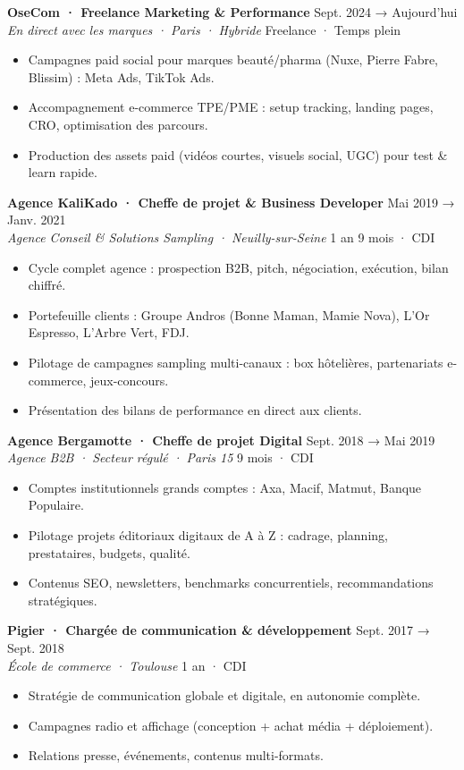 \documentclass[a4paper,10pt]{article}
\newcommand{\expheader}[4]{%
  \textbf{\color{brown}#1} \hfill \color{greydark}\footnotesize #2 \\[-1pt]
  \textit{\color{greydark}\small #3} \hfill \color{greymid}\footnotesize #4 \\[2pt]
}
\begin{document}
\expheader{OseCom · Freelance Marketing \& Performance}{Sept. 2024 → Aujourd'hui}{En direct avec les marques · Paris · Hybride}{Freelance · Temps plein}
\begin{itemize}[leftmargin=12pt,itemsep=1pt,topsep=2pt]
  \item Campagnes paid social pour marques beauté/pharma (Nuxe, Pierre Fabre, Blissim) : Meta Ads, TikTok Ads.
  \item Accompagnement e-commerce TPE/PME : setup tracking, landing pages, CRO, optimisation des parcours.
  \item Production des assets paid (vidéos courtes, visuels social, UGC) pour test \& learn rapide.
\end{itemize}

\expheader{Agence KaliKado · Cheffe de projet \& Business Developer}{Mai 2019 → Janv. 2021}{Agence Conseil \& Solutions Sampling · Neuilly-sur-Seine}{1 an 9 mois · CDI}
\begin{itemize}[leftmargin=12pt,itemsep=1pt,topsep=2pt]
  \item Cycle complet agence : prospection B2B, pitch, négociation, exécution, bilan chiffré.
  \item Portefeuille clients : Groupe Andros (Bonne Maman, Mamie Nova), L'Or Espresso, L'Arbre Vert, FDJ.
  \item Pilotage de campagnes sampling multi-canaux : box hôtelières, partenariats e-commerce, jeux-concours.
  \item Présentation des bilans de performance en direct aux clients.
\end{itemize}

\expheader{Agence Bergamotte · Cheffe de projet Digital}{Sept. 2018 → Mai 2019}{Agence B2B · Secteur régulé · Paris 15}{9 mois · CDI}
\begin{itemize}[leftmargin=12pt,itemsep=1pt,topsep=2pt]
  \item Comptes institutionnels grands comptes : Axa, Macif, Matmut, Banque Populaire.
  \item Pilotage projets éditoriaux digitaux de A à Z : cadrage, planning, prestataires, budgets, qualité.
  \item Contenus SEO, newsletters, benchmarks concurrentiels, recommandations stratégiques.
\end{itemize}

\expheader{Pigier · Chargée de communication \& développement}{Sept. 2017 → Sept. 2018}{École de commerce · Toulouse}{1 an · CDI}
\begin{itemize}[leftmargin=12pt,itemsep=1pt,topsep=2pt]
  \item Stratégie de communication globale et digitale, en autonomie complète.
  \item Campagnes radio et affichage (conception + achat média + déploiement).
  \item Relations presse, événements, contenus multi-formats.
\end{itemize}
\end{document}
